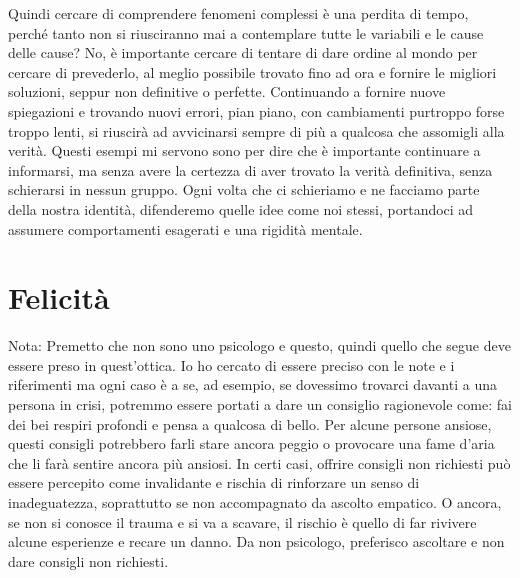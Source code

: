 \documentclass[12pt]{book} %
\begin{document}
\begin{mdframed}[linewidth=1pt]
Quindi cercare di comprendere fenomeni complessi è una perdita di tempo, perché tanto non si riusciranno mai a contemplare tutte le variabili e le cause delle cause? No, è importante cercare di tentare di dare ordine al mondo per cercare di prevederlo, al meglio possibile trovato fino ad ora e fornire le migliori soluzioni, seppur non definitive o perfette.
Continuando a fornire nuove spiegazioni e trovando nuovi errori, pian piano, con cambiamenti purtroppo forse troppo lenti, si riuscirà ad avvicinarsi sempre di più a qualcosa che assomigli alla verità.
Questi esempi mi servono sono per dire che è importante continuare a informarsi, ma senza avere la certezza di aver trovato la verità definitiva, senza schierarsi in nessun gruppo. Ogni volta che ci schieriamo e ne facciamo parte della nostra identità, difenderemo quelle idee come noi stessi, portandoci ad assumere comportamenti esagerati e una rigidità mentale.
\end{mdframed}
\bigskip


\bigskip

\clearpage\section{Felicità}

\bigskip
\bigskip
\begin{mdframed}[linewidth=1pt]
Nota: Premetto che non sono uno psicologo e questo, quindi quello che segue deve essere preso in
quest'ottica. Io ho cercato di essere preciso con le note e i riferimenti ma ogni caso è a se, ad
esempio, se dovessimo trovarci davanti a una persona in crisi, potremmo essere portati a dare un consiglio ragionevole
come: fai dei bei respiri profondi e pensa a qualcosa di bello. Per alcune persone ansiose, questi consigli potrebbero
farli stare ancora peggio o provocare una fame d'aria che li farà sentire ancora più ansiosi.
In certi casi, offrire consigli non richiesti può essere percepito come invalidante e rischia di rinforzare un senso di inadeguatezza, soprattutto se non accompagnato da ascolto empatico. O ancora, se non si conosce il trauma e si va a scavare, il rischio è quello di far rivivere alcune esperienze e recare
un danno. Da non psicologo, preferisco ascoltare e non dare consigli non richiesti.
\end{mdframed}
\end{document}
